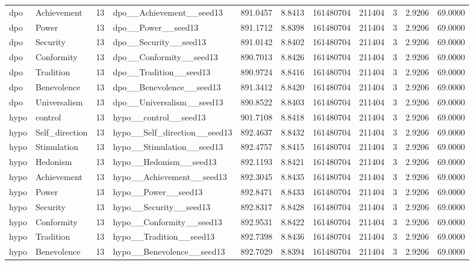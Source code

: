 \begin{tabular}{llrlrrrrrrr}
dpo & Achievement & 13 & dpo\_\_Achievement\_\_seed13 & 891.0457 & 8.8413 & 161480704 & 211404 & 3 & 2.9206 & 69.0000 \\
dpo & Power & 13 & dpo\_\_Power\_\_seed13 & 891.1712 & 8.8398 & 161480704 & 211404 & 3 & 2.9206 & 69.0000 \\
dpo & Security & 13 & dpo\_\_Security\_\_seed13 & 891.0142 & 8.8402 & 161480704 & 211404 & 3 & 2.9206 & 69.0000 \\
dpo & Conformity & 13 & dpo\_\_Conformity\_\_seed13 & 890.7013 & 8.8426 & 161480704 & 211404 & 3 & 2.9206 & 69.0000 \\
dpo & Tradition & 13 & dpo\_\_Tradition\_\_seed13 & 890.9724 & 8.8416 & 161480704 & 211404 & 3 & 2.9206 & 69.0000 \\
dpo & Benevolence & 13 & dpo\_\_Benevolence\_\_seed13 & 891.3412 & 8.8420 & 161480704 & 211404 & 3 & 2.9206 & 69.0000 \\
dpo & Universalism & 13 & dpo\_\_Universalism\_\_seed13 & 890.8522 & 8.8403 & 161480704 & 211404 & 3 & 2.9206 & 69.0000 \\
hypo & control & 13 & hypo\_\_control\_\_seed13 & 901.7108 & 8.8418 & 161480704 & 211404 & 3 & 2.9206 & 69.0000 \\
hypo & Self\_direction & 13 & hypo\_\_Self\_direction\_\_seed13 & 892.4637 & 8.8432 & 161480704 & 211404 & 3 & 2.9206 & 69.0000 \\
hypo & Stimulation & 13 & hypo\_\_Stimulation\_\_seed13 & 892.4757 & 8.8415 & 161480704 & 211404 & 3 & 2.9206 & 69.0000 \\
hypo & Hedonism & 13 & hypo\_\_Hedonism\_\_seed13 & 892.1193 & 8.8421 & 161480704 & 211404 & 3 & 2.9206 & 69.0000 \\
hypo & Achievement & 13 & hypo\_\_Achievement\_\_seed13 & 892.3045 & 8.8435 & 161480704 & 211404 & 3 & 2.9206 & 69.0000 \\
hypo & Power & 13 & hypo\_\_Power\_\_seed13 & 892.8471 & 8.8433 & 161480704 & 211404 & 3 & 2.9206 & 69.0000 \\
hypo & Security & 13 & hypo\_\_Security\_\_seed13 & 892.8317 & 8.8428 & 161480704 & 211404 & 3 & 2.9206 & 69.0000 \\
hypo & Conformity & 13 & hypo\_\_Conformity\_\_seed13 & 892.9531 & 8.8422 & 161480704 & 211404 & 3 & 2.9206 & 69.0000 \\
hypo & Tradition & 13 & hypo\_\_Tradition\_\_seed13 & 892.7398 & 8.8436 & 161480704 & 211404 & 3 & 2.9206 & 69.0000 \\
hypo & Benevolence & 13 & hypo\_\_Benevolence\_\_seed13 & 892.7029 & 8.8394 & 161480704 & 211404 & 3 & 2.9206 & 69.0000 \\

\end{tabular}
